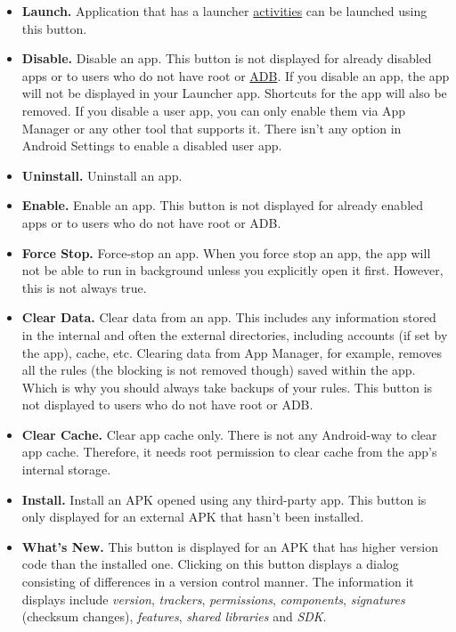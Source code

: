 \begin{itemize}
    \item \textbf{Launch.} Application that has a launcher \hyperref[subsubsec:activities]{activities} can be launched
    using this button.

    \item \textbf{Disable.} Disable an app. This button is not displayed for already disabled apps or to users who do
    not have root or \hyperref[sec:adb-over-tcp]{ADB}. If you disable an app, the app will not be displayed in your
    Launcher app. Shortcuts for the app will also be removed. If you disable a user app, you can only enable them via
    App Manager or any other tool that supports it. There isn't any option in Android Settings to enable a disabled user
    app.

    \item \textbf{Uninstall.} Uninstall an app.

    \item \textbf{Enable.} Enable an app. This button is not displayed for already enabled apps or to users who do not
    have root or ADB\@.

    \item \textbf{Force Stop.} Force-stop an app. When you force stop an app, the app will not be able to run in
    background unless you explicitly open it first. However, this is not always true.

    \item \textbf{Clear Data.} Clear data from an app. This includes any information stored in the internal and often
    the external directories, including accounts (if set by the app), cache, etc. Clearing data from App Manager, for
    example, removes all the rules (the blocking is not removed though) saved within the app. Which is why you should
    always take backups of your rules. This button is not displayed to users who do not have root or ADB\@.

    \item \textbf{Clear Cache.} Clear app cache only. There is not any Android-way to clear app cache. Therefore, it
    needs root permission to clear cache from the app's internal storage.

    \item \textbf{Install.} Install an APK opened using any third-party app. This button is only displayed for an
    external APK that hasn't been installed.

    \item \textbf{What's New.} This button is displayed for an APK that has higher version code than the installed one.
    Clicking on this button displays a dialog consisting of differences in a version control manner. The information it
    displays include \textit{version}, \textit{trackers}, \textit{permissions}, \textit{components}, \textit{signatures}
    (checksum changes), \textit{features}, \textit{shared libraries} and \textit{SDK}.


\end{itemize}
